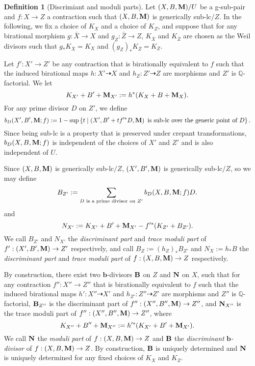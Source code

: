 \documentclass[11pt]{amsart}
\numberwithin{equation}{section}
\newcommand{\bb}{\bm{b}}
\newcommand{\Mm}{{\bf{M}}}
\newcommand{\Nn}{{\bf{N}}}
\newcommand{\Qq}{\mathbb{Q}}
\newcommand{\Bb}{{\bf{B}}}
\theoremstyle{definition}
\newtheorem{defn}[thm]{Definition}
\theoremstyle{definition}
\theoremstyle{definition}
\begin{document}
\begin{defn}[Discrimiant and moduli parts] \label{defn: moduli part}
Let $(X,B,\Mm)/U$ be a g-sub-pair and $f: X\rightarrow Z$ a contraction such that $(X,B,\Mm)$ is generically sub-lc$/Z$. In the following, we fix a choice of $K_X$ and a choice of $K_Z$, and suppose that for any birational morphism $g: \bar X\rightarrow X$ and $g_Z: \bar Z\rightarrow Z$, $K_{\bar X}$ and $K_{\bar Z}$ are chosen as the Weil divisors such that $g_*K_{\bar X}=K_X$ and $(g_Z)_*K_{\bar Z}=K_Z$.

Let $f': X'\rightarrow Z'$ be any contraction that is birationally equivalent to $f$ such that the induced birational maps $h: X'\dashrightarrow X$ and  $h_Z: Z'\dashrightarrow Z$ are morphisms and $Z'$ is $\Qq$-factorial. We let 
$$K_{X'}+B'+\Mm_{X'}:=h^*(K_X+B+\Mm_X).$$ 
For any prime divisor $D$ on $Z'$, we define
$$b_D(X',B',\Mm;f):=1-\sup\left\{t\mid \left(X',B'+tf'^*D,\Mm\right)\text{ is sub-lc over the generic point of } D\right\}.$$
Since being sub-lc is a property that is preserved under crepant transformations, $b_D(X,B,\Mm;f)$ is independent of the choices of $X'$ and $Z'$ and is also independent of $U$.

Since $(X,B,\Mm)$ is generically sub-lc$/Z$, $(X',B',\Mm)$ is generically sub-lc$/Z$, so we may define
$$B_{Z'}:=\sum_{D\text{ is a prime divisor on }Z'}b_D(X,B,\Mm;f)D.$$
and $$N_{X'}:=K_{X'}+B'+\Mm_{X'}-f'^*(K_{Z'}+B_{Z'}).$$
We call $B_{Z'}$ and $N_{X'}$ the \emph{discriminant part} and \emph{trace moduli part} of $f': (X',B',\Mm)\rightarrow Z'$ respectively, and call $B_Z:=(h_Z)_*B_{Z'}$ and $N_X:=h_*B$ the \emph{discriminant part} and \emph{trace moduli part} of $f: (X,B,\Mm)\rightarrow Z$ respectively.

By construction, there exist two $\bb$-divisors $\Bb$ on $Z$ and $\Nn$ on $X$, such that for any contraction $f'': X''\rightarrow Z''$ that is birationally equivalent to $f$ such that the induced birational maps $h': X''\dashrightarrow X'$ and  $h_{Z'}: Z''\dashrightarrow Z'$ are morphisms and $Z''$ is $\Qq$-factorial, $\Bb_{Z''}$ is the discriminant part of $f'': (X'',B'',\Mm)\rightarrow Z''$, and $\Nn_{X''}$ is the trace moduli part of  $f'': (X'',B'',\Mm)\rightarrow Z''$, where 
$$K_{X''}+B''+\Mm_{X''}:=h'^*(K_{X'}+B'+\Mm_{X'}).$$ 
We call $\Nn$ the \emph{moduli part} of $f: (X,B,\Mm)\rightarrow Z$ and $\Bb$ the \emph{discriminant $\bb$-divisor} of $f: (X,B,\Mm)\rightarrow Z$. By construction, $\Bb$ is uniquely determined and $\Nn$ is uniquely determined for any fixed choices of $K_X$ and $K_Z$.
\end{defn}
\end{document}

